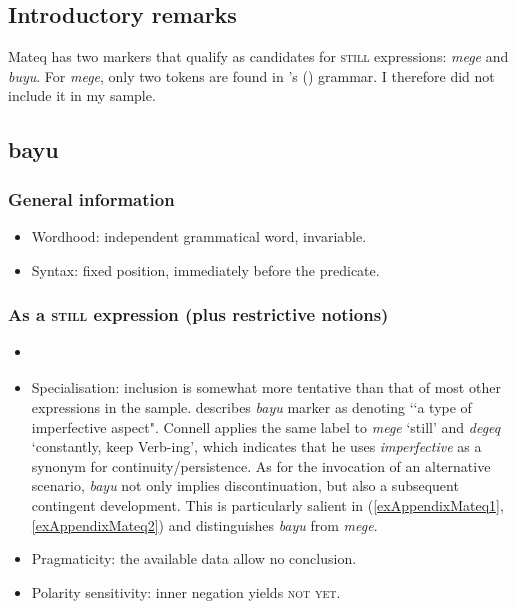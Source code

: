 \subsection{Introductory remarks}
Mateq has two markers that qualify as candidates for \textsc{still} expressions: \textit{mege} and \textit{buyu}. For \textit{mege}, only two tokens are found in \citeauthor{Connell2013}'s (\citeyear{Connell2013}) grammar. I therefore did not include it in my sample.

\subsection{bayu}
\subsubsection{General information}
\begin{itemize}
	\item Wordhood: independent grammatical word, invariable.
	\item Syntax: fixed position, immediately before the predicate.
\end{itemize}

\subsubsection{As a \textsc{still} expression (plus restrictive notions)}
\label{appendixMateqStill}
\begin{itemize}
	\item \textcite[137–138]{Connell2013}
	\item Specialisation: inclusion is somewhat more tentative than that of most other expressions in the sample. \textcite[137]{Connell2013} describes \textit{bayu} marker as denoting \lq\lq a type of imperfective aspect". Connell applies the same label to \textit{mege} \lq still' and \textit{degeq} \lq constantly, keep Verb-ing', which indicates that he uses \textit{imperfective} as a synonym for continuity/persistence. 	As for the invocation of an alternative scenario, \textit{bayu} not only implies discontinuation, but also a subsequent contingent development. This is particularly salient in (\ref{exAppendixMateq1}, \ref{exAppendixMateq2}) and distinguishes \textit{bayu} from \textit{mege}.

	\item Pragmaticity: the available data allow no conclusion.
	\item Polarity sensitivity: inner negation yields \textsc{not yet}.
\end{itemize}

